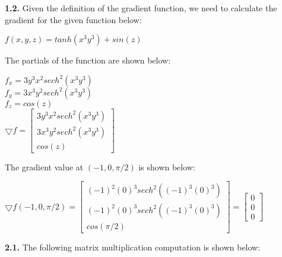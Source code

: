 \documentclass[12pt]{article}
\begin{document}
{\bf 1.2.} Given the definition of the gradient function, we need to calculate the gradient for the given function below:

\begin{center}

$f(x,y,z)=tanh(x^{3}y^{3})+sin(z)$\\

\end{center}

The partials of the function are shown below:

\begin{center}

$f_{x}=3y^{3}x^{2}sech^{2}(x^{3}y^{3})$\\
\bigskip
$f_{y}=3x^{3}y^{2}sech^{2}(x^{3}y^{3})$\\
\bigskip
$f_{z}=cos(z)$\\
\bigskip
$
\bigtriangledown f=
\begin{bmatrix}
3y^{3}x^{2}sech^{2}(x^{3}y^{3})\\
3x^{3}y^{2}sech^{2}(x^{3}y^{3})\\
cos(z)
\end{bmatrix}
$

\end{center}

The gradient value at $(-1,0,\pi/2)$ is shown below:

\begin{center}

$
\bigtriangledown f(-1,0,\pi/2)=
\begin{bmatrix}
(-1)^{2}(0)^{3}sech^{2}((-1)^{3}(0)^{3})\\
(-1)^{2}(0)^{3}sech^{2}((-1)^{3}(0)^{3})\\
cos(\pi/2)
\end{bmatrix}=
\begin{bmatrix}
0\\
0\\
0
\end{bmatrix}
$\\

\end{center}

{\bf 2.1.} The following matrix multiplication computation is shown below:
\end{document}
